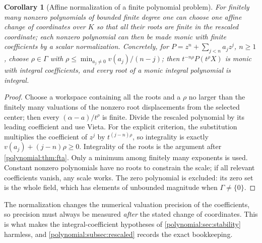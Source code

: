 \documentclass[11pt,letterpaper]{article}
\numberwithin{equation}{section}
\newtheorem{corollary}[theorem]{Corollary}
\theoremstyle{definition}
\theoremstyle{remark}\newtheorem{remark}[theorem]{Remark}
\begin{document}
\begin{corollary}[Affine normalization of a finite polynomial problem]
\label{polynomial:cor:normalization}
For finitely many nonzero polynomials of bounded finite degree one can choose one
affine change of coordinates over $K$ so that all their roots are finite in
the rescaled coordinate; each nonzero polynomial can then be made monic with
finite coefficients by a scalar normalization. Concretely, for
$P=z^n+\sum_{j<n}a_jz^j$, $n\ge1$, choose $\rho\in\Gamma$ with
$\rho\le\min_{a_j\ne0}v(a_j)/(n-j)$; then $t^{-n\rho}P(t^\rho X)$ is monic with
integral coefficients, and every root of a monic integral polynomial is
integral.
\end{corollary}
\begin{proof}
Choose a workspace containing all the roots and a $\rho$ no larger than the
finitely many valuations of the nonzero root displacements from the selected
center; then every $(\alpha-a)/t^\rho$ is finite. Divide the rescaled
polynomial by its leading coefficient and use Vieta. For the explicit
criterion, the substitution multiplies the coefficient of $z^j$ by
$t^{(j-n)\rho}$, so integrality is exactly $v(a_j)+(j-n)\rho\ge0$. Integrality
of the roots is the argument after
\cref{polynomial:thm:fta}. Only a minimum among finitely many exponents is
used. Constant nonzero polynomials have no roots to constrain the scale;
if all relevant coefficients vanish, any scale works. The zero polynomial
is excluded: its zero set is the whole field, which has elements of unbounded
magnitude when $\Gamma\ne\{0\}$.
\end{proof}

The normalization changes the numerical valuation precision of the
coefficients, so precision must always be measured \emph{after} the stated
change of coordinates. This is what makes the integral-coefficient hypotheses
of \cref{polynomial:sec:stability} harmless, and
\cref{polynomial:subsec:rescaled} records the exact bookkeeping.
\end{document}
